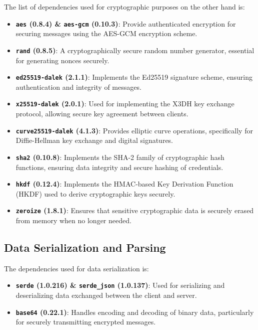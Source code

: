 The list of dependencies used for cryptographic purposes on the other hand is:

\begin{itemize}
  \item \textbf{\texttt{aes} (0.8.4) \& \texttt{aes-gcm} (0.10.3)}: Provide authenticated encryption for securing messages using the AES-GCM encryption scheme.
  \item \textbf{\texttt{rand} (0.8.5)}: A cryptographically secure random number generator, essential for generating nonces securely.
  \item \textbf{\texttt{ed25519-dalek} (2.1.1)}: Implements the Ed25519 signature scheme, ensuring authentication and integrity of messages.
  \item \textbf{\texttt{x25519-dalek} (2.0.1)}: Used for implementing the X3DH key exchange protocol, allowing secure key agreement between clients.
  \item \textbf{\texttt{curve25519-dalek} (4.1.3)}: Provides elliptic curve operations, specifically for Diffie-Hellman key exchange and digital signatures.
  \item \textbf{\texttt{sha2} (0.10.8)}: Implements the SHA-2 family of cryptographic hash functions, ensuring data integrity and secure hashing of credentials.
  \item \textbf{\texttt{hkdf} (0.12.4)}: Implements the HMAC-based Key Derivation Function (HKDF) used to derive cryptographic keys securely.
  \item \textbf{\texttt{zeroize} (1.8.1)}: Ensures that sensitive cryptographic data is securely erased from memory when no longer needed.
\end{itemize}

\subsection{Data Serialization and Parsing}  
\label{subsec:DataSerializatinAndParsin}

The dependencies used for data serialization is:

\begin{itemize}
  \item \textbf{\texttt{serde} (1.0.216) \& \texttt{serde\_json} (1.0.137)}: Used for serializing and deserializing data exchanged between the client and server.
  \item \textbf{\texttt{base64} (0.22.1)}: Handles encoding and decoding of binary data, particularly for securely transmitting encrypted messages.
\end{itemize}

